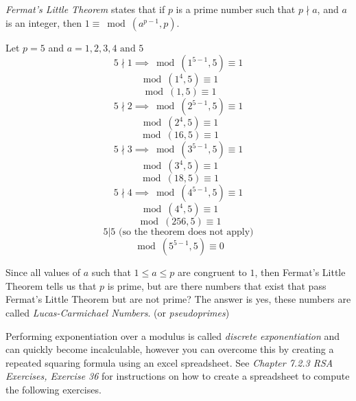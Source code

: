   \emph{Fermat's Little Theorem} states that if $p$ is a prime number such that $p \nmid a$, and $a$ is an integer, then $1 \equiv \bmod(a^{p-1}, p)$.

\begin{eg} Let $p = 5$ and $a = 1, 2, 3, 4 \text{ and } 5$
$$ 5 \nmid 1 \implies \bmod(1^{5-1}, 5) \equiv 1$$
$$ \bmod(1^{4}, 5) \equiv 1$$
$$ \bmod(1, 5) \equiv 1$$
$$ 5 \nmid 2 \implies \bmod(2^{5-1}, 5) \equiv 1$$
$$ \bmod(2^{4}, 5) \equiv 1$$
$$ \bmod(16, 5) \equiv 1$$
$$ 5 \nmid 3 \implies \bmod(3^{5-1}, 5) \equiv 1$$
$$ \bmod(3^{4}, 5) \equiv 1$$
$$ \bmod(18	, 5) \equiv 1$$
$$ 5 \nmid 4 \implies \bmod(4^{5-1}, 5) \equiv 1$$
$$ \bmod(4^{4}, 5) \equiv 1$$
$$ \bmod(256, 5) \equiv 1$$
$$ 5 | 5 \text { (so the theorem does not apply)}$$
$$ \bmod(5^{5-1}, 5) \equiv 0$$
\end{eg}
Since all values of $a$ such that $1 \leq a \leq p$ are congruent to $1$, then Fermat's Little Theorem tells us that $p$ is prime, but are there numbers that exist that pass Fermat's Little Theorem but are not prime?  The answer is yes, these numbers are called \emph{Lucas-Carmichael Numbers}.  (or \emph{pseudoprimes}) 

Performing exponentiation over a modulus is called \emph{discrete exponentiation} and can quickly become incalculable, however you can overcome this by creating a repeated squaring formula using an excel spreadsheet.  See \emph{Chapter 7.2.3 RSA Exercises, Exercise 36} for instructions on how to create a spreadsheet to compute the following exercises.
 
